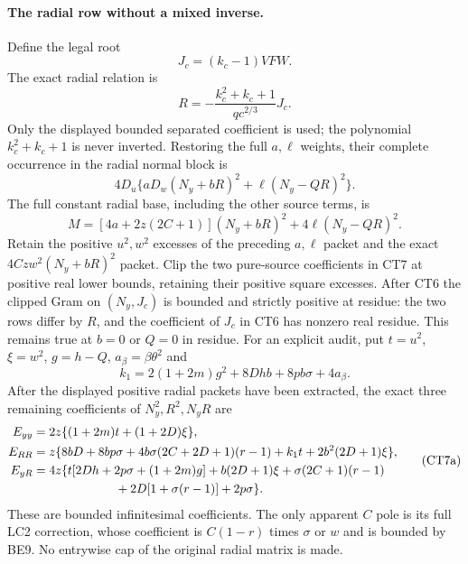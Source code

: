 \paragraph{The radial row without a mixed inverse.}
Define the legal root
\[
 J_c=(k_c-1)VFW.
\]
The exact radial relation is
\[
 R=-\frac{k_c^2+k_c+1}{q c^{2/3}}J_c.           \tag{CT6}
\]
Only the displayed bounded separated coefficient is used; the
polynomial $k_c^2+k_c+1$ is never inverted.
Restoring the full $a,\ell$ weights, their complete occurrence in
the radial normal block is
\[
 4D_u\{aD_w(N_y+bR)^2+\ell(N_y-QR)^2\}.
\]
The full constant radial base, including the other source terms, is
\[
 M=[4a+2z(2C+1)](N_y+bR)^2+4\ell(N_y-QR)^2.    \tag{CT7}
\]
Retain the positive $u^2,w^2$ excesses of the preceding $a,\ell$
packet and the exact $4Cz w^2(N_y+bR)^2$ packet.  Clip the two
pure-source coefficients in CT7 at positive real lower bounds,
retaining their positive square excesses.  After CT6 the clipped
Gram on $(N_y,J_c)$ is bounded and strictly positive at residue:
the two rows differ by $R$, and the coefficient of $J_c$ in CT6
has nonzero real residue.  This remains true at $b=0$ or $Q=0$
in residue.  For an explicit audit, put $t=u^2$, $\xi=w^2$,
$g=h-Q$, $a_\beta=\beta\theta^2$ and
\[
 k_1=2(1+2m)g^2+8Dhb+8pb\sigma+4a_\beta.
\]
After the displayed positive radial packets have been extracted,
the exact three remaining coefficients of $N_y^2,R^2,N_yR$ are
\[
\begin{split}
 E_{yy}={}&2z\{(1+2m)t+(1+2D)\xi\},\\
 E_{RR}={}&z\{8bD+8bp\sigma
       +4b\sigma(2C+2D+1)(r-1)+k_1t
       +2b^2(2D+1)\xi\},\\
 E_{yR}={}&4z\{t[2Dh+2p\sigma+(1+2m)g]
       +b(2D+1)\xi+\sigma(2C+1)(r-1)\\
       &\hspace{19mm}+2D[1+\sigma(r-1)]+2p\sigma\}.
\end{split}                                                     \tag{CT7a}
\]
These are bounded infinitesimal coefficients.  The only apparent
$C$ pole is its full LC2 correction,
whose coefficient is $C(1-r)$ times $\sigma$ or $w$ and is bounded
by BE9.  No entrywise cap of the original radial matrix is made.

